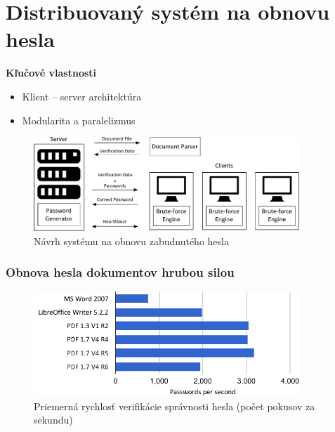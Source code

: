 \documentclass[xcolor=dvipsnames]{beamer}
\def\itemtitle#1{{\bfseries#1\smallskip}}
\begin{document}
\section{Distribuovaný systém na obnovu hesla}
\begin{frame}
	\itemtitle{Kľučové vlastnosti}
	\begin{itemize}
		\item Klient -- server architektúra
		\item Modularita a paralelizmus
	\end{itemize}
	\bigskip
	\begin{figure}[h]
		\centering
		\includegraphics[width=100mm]{images/ddpbf_design.pdf} \\	
		\bigskip
		\scriptsize{Návrh systému na obnovu zabudnutého hesla}	
	\end{figure}
\end{frame}


\begin{frame}
	\frametitle{Obnova hesla dokumentov hrubou silou}
	
	\begin{figure}[h]
		\centering
		\includegraphics[width=100mm]{images/average_speed.pdf} \\	
		\bigskip
		\scriptsize{Priemerná rychlosť verifikácie správnosti hesla (počet pokusov za sekundu)}	
	\end{figure}
\end{frame}

\end{document}
